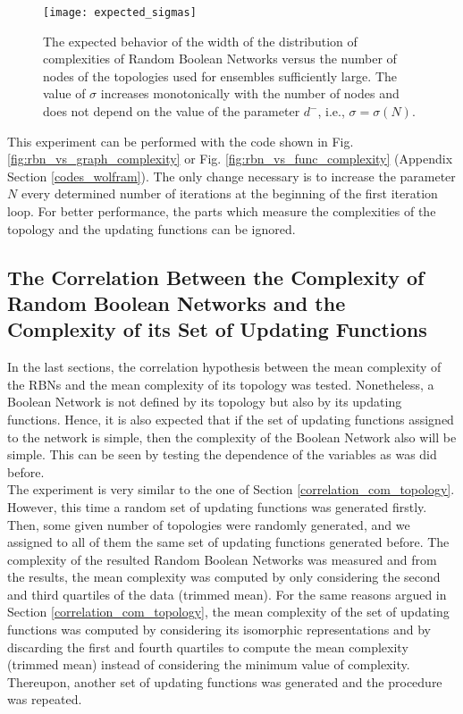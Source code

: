 \begin{figure}
\centering
\texttt{[image: expected\_sigmas]}
\caption[The expected behavior of the width of the distribution of complexities of Random Boolean Networks versus the number of nodes of the topologies.]{The expected behavior of the width of the distribution of complexities of Random Boolean Networks versus the number of nodes of the topologies used for ensembles sufficiently large. The value of $\sigma$ increases monotonically with the number of nodes and does not depend on the value of the parameter $d^{-}$, i.e., $\sigma = \sigma (N)$.}
\label{fig:expected_sigmas}
\end{figure}

This experiment can be performed with the code shown in Fig. \ref{fig:rbn_vs_graph_complexity} or Fig. \ref{fig:rbn_vs_func_complexity} (Appendix Section \ref{codes_wolfram}). The only change necessary is to increase the parameter $N$ every determined number of iterations at the beginning of the first iteration loop. For better performance, the parts which measure the complexities of the topology and the updating functions can be ignored. 

\subsection{The Correlation Between the Complexity of Random Boolean Networks and the Complexity of its Set of Updating Functions}
In the last sections, the correlation hypothesis between the mean complexity of the RBNs and the mean complexity of its topology was tested. Nonetheless, a Boolean Network is not defined by its topology but also by its updating functions. Hence, it is also expected that if the set of updating functions assigned to the network is simple, then the complexity of the Boolean Network also will be simple. This can be seen by testing the dependence of the variables as was did before.\\

The experiment is very similar to the one of Section \ref{correlation_com_topology}. However, this time a random set of updating functions was generated firstly. Then, some given number of topologies were randomly generated, and we assigned to all of them the same set of updating functions generated before. The complexity of the resulted Random Boolean Networks was measured and from the results, the mean complexity was computed by only considering the second and third quartiles of the data (trimmed mean). For the same reasons argued in Section \ref{correlation_com_topology}, the mean complexity of the set of updating functions was computed by considering its isomorphic representations and by discarding the first and fourth quartiles to compute the mean complexity (trimmed mean) instead of considering the minimum value of complexity. Thereupon, another set of updating functions was generated and the procedure was repeated.\\

